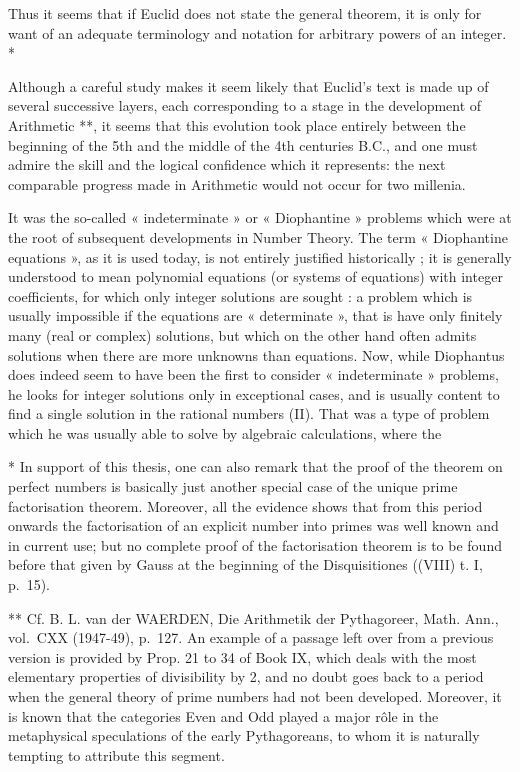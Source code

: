 Thus it seems that if Euclid does not state the general theorem, it is only for want of an adequate terminology and notation for arbitrary powers of an integer. *

Although a careful study makes it seem likely that Euclid's text is made up of several successive layers, each corresponding to a stage in the development of Arithmetic **, it seems that this evolution took place entirely between the beginning of the 5th and the middle of the 4th centuries B.C., and one must admire the skill and the logical confidence which it represents: the next comparable progress made in Arithmetic would not occur for two millenia.

It was the so-called « indeterminate » or « Diophantine » problems which were at the root of subsequent developments in Number Theory. The term « Diophantine equations », as it is used today, is not entirely justified historically ; it is generally understood to mean polynomial equations (or systems of equations) with integer coefficients, for which only integer solutions are sought : a problem which is usually impossible if the equations are « determinate », that is have only finitely many (real or complex) solutions, but which on the other hand often admits solutions when there are more unknowns than equations. Now, while Diophantus does indeed seem to have been the first to consider « indeterminate » problems, he looks for integer solutions only in exceptional cases, and is usually content to find a single solution in the rational numbers (II). That was a type of problem which he was usually able to solve by algebraic calculations, where the

* In support of this thesis, one can also remark that the proof of the theorem on perfect numbers is basically just another special case of the unique prime factorisation theorem. Moreover, all the evidence shows that from this period onwards the factorisation of an explicit number into primes was well known and in current use; but no complete proof of the factorisation theorem is to be found before that given by Gauss at the beginning of the Disquisitiones ((VIII) t. I, p.~15).

** Cf. B. L. van der WAERDEN, Die Arithmetik der Pythagoreer, Math. Ann., vol.~CXX (1947-49), p.~127. An example of a passage left over from a previous version is provided by Prop. 21 to 34 of Book IX, which deals with the most elementary properties of divisibility by 2, and no doubt goes back to a period when the general theory of prime numbers had not been developed. Moreover, it is known that the categories Even and Odd played a major rôle in the metaphysical speculations of the early Pythagoreans, to whom it is naturally tempting to attribute this segment.

